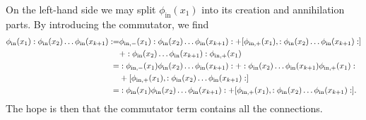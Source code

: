 On the left-hand side we may split $\phi_{\text{in}}(x_{1})$ into its creation and annihilation parts. By introducing the commutator, we find
\begin{align*}
	\phi_{\text{in}}(x_{1})\nop{\phi_{\text{in}}(x_{2})\dots\phi_{\text{in}}(x_{k + 1})} =& \phi_{\text{in}, -}(x_{1})\nop{\phi_{\text{in}}(x_{2})\dots\phi_{\text{in}}(x_{k + 1})} + \comm{\phi_{\text{in}, +}(x_{1})}{\nop{\phi_{\text{in}}(x_{2})\dots\phi_{\text{in}}(x_{k + 1})}} \\
	 &+ \nop{\phi_{\text{in}}(x_{2})\dots\phi_{\text{in}}(x_{k + 1})}\phi_{\text{in}, +}(x_{1}) \\
	=& \nop{\phi_{\text{in}, -}(x_{1})\phi_{\text{in}}(x_{2})\dots\phi_{\text{in}}(x_{k + 1})} + \nop{\phi_{\text{in}}(x_{2})\dots\phi_{\text{in}}(x_{k + 1})\phi_{\text{in}, +}(x_{1})} \\
	 &+ \comm{\phi_{\text{in}, +}(x_{1})}{\nop{\phi_{\text{in}}(x_{2})\dots\phi_{\text{in}}(x_{k + 1})}} \\
	=& \nop{\phi_{\text{in}}(x_{1})\phi_{\text{in}}(x_{2})\dots\phi_{\text{in}}(x_{k + 1})} + \comm{\phi_{\text{in}, +}(x_{1})}{\nop{\phi_{\text{in}}(x_{2})\dots\phi_{\text{in}}(x_{k + 1})}}.
\end{align*}
The hope is then that the commutator term contains all the connections.

